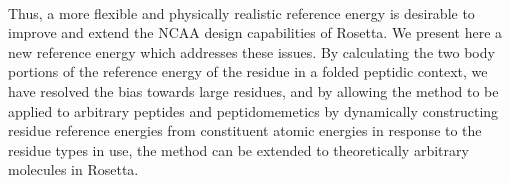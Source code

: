 \paragraph{}
Thus, a more flexible and physically realistic reference energy is desirable to improve and extend the NCAA design capabilities of Rosetta.
We present here a new reference energy which addresses these issues.
By calculating the two body portions of the reference energy of the residue in a folded peptidic context, we have resolved the bias towards large residues, and by allowing the method to be applied to arbitrary peptides and peptidomemetics by dynamically constructing residue reference energies from constituent atomic energies in response to the residue types in use, the method can be extended to theoretically arbitrary molecules in Rosetta.


